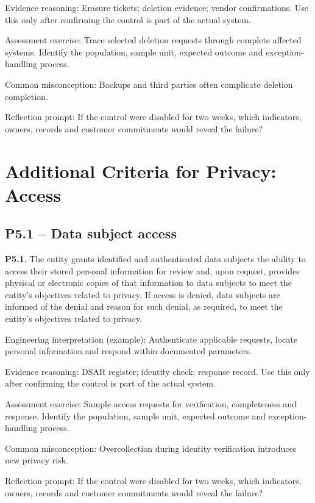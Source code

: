\documentclass[10pt,oneside]{report}
\begin{document}
Evidence reasoning: Erasure tickets; deletion evidence; vendor confirmations. Use this only after confirming the control is part of the actual system.

Assessment exercise: Trace selected deletion requests through complete affected systems. Identify the population, sample unit, expected outcome and exception-handling process.

Common misconception: Backups and third parties often complicate deletion completion.

Reflection prompt: If the control were disabled for two weeks, which indicators, owners, records and customer commitments would reveal the failure?

\section{Additional Criteria for Privacy: Access}
\subsection{P5.1 -- Data subject access}
\begin{aicpabox}
\textbf{P5.1}. The entity grants identified and authenticated data subjects the ability to access their stored personal information for review and, upon request, provides physical or electronic copies of that information to data subjects to meet the entity's objectives related to privacy. If access is denied, data subjects are informed of the denial and reason for such denial, as required, to meet the entity's objectives related to privacy.\par{}
\end{aicpabox}
Engineering interpretation (example): Authenticate applicable requests, locate personal information and respond within documented parameters.

Evidence reasoning: DSAR register; identity check; response record. Use this only after confirming the control is part of the actual system.

Assessment exercise: Sample access requests for verification, completeness and response. Identify the population, sample unit, expected outcome and exception-handling process.

Common misconception: Overcollection during identity verification introduces new privacy risk.

Reflection prompt: If the control were disabled for two weeks, which indicators, owners, records and customer commitments would reveal the failure?
\end{document}
